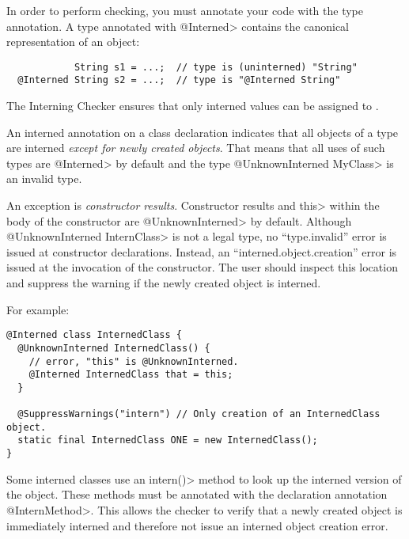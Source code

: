 In order to perform checking, you must annotate your code with the 
type annotation.  A type annotated with \<@Interned> contains the canonical
representation of an
object:

\begin{smaller}
\begin{Verbatim}
            String s1 = ...;  // type is (uninterned) "String"
  @Interned String s2 = ...;  // type is "@Interned String"
\end{Verbatim}
\end{smaller}

The Interning Checker ensures that only interned
values can be assigned to .


An interned annotation on a class declaration indicates that all objects of a
type are interned \textit{except for newly created objects}. That means that
all uses of such types are \<@Interned> by default and the type \<@UnknownInterned
MyClass> is an invalid type.

An exception is \textit{constructor results}. Constructor results and \<this> within the
body of the constructor are \<@UnknownInterned> by default. Although \<@UnknownInterned InternClass>
is not a legal type, no ``type.invalid'' error is issued at constructor declarations.
Instead, an ``interned.object.creation''
error is issued at the invocation of the constructor. The user should inspect
this location and suppress the warning if the newly created object is interned.

For example:

\begin{Verbatim}
@Interned class InternedClass {
  @UnknownInterned InternedClass() {
    // error, "this" is @UnknownInterned.
    @Interned InternedClass that = this;
  }

  @SuppressWarnings("intern") // Only creation of an InternedClass object.
  static final InternedClass ONE = new InternedClass();
}
\end{Verbatim}

Some interned classes use an \<intern()> method to look up the interned version of
the object. These methods must be annotated with the declaration annotation
\<@InternMethod>. This allows the checker to verify that a newly created object
is immediately interned and therefore not issue an interned object creation
error.


